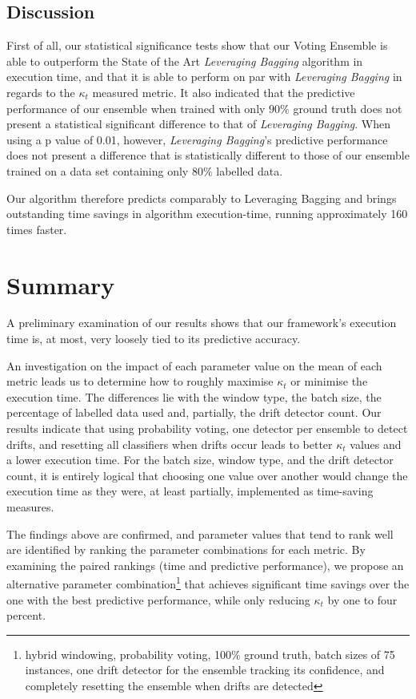 \subsection{Discussion}
First of all, our statistical significance tests show that our Voting Ensemble is able to outperform the State of the Art \textit{Leveraging Bagging} algorithm in execution time, and that it is able to perform on par with \textit{Leveraging Bagging} in regards to the $\kappa_t$ measured metric. It also indicated that the predictive performance of our ensemble when trained with only $90\%$ ground truth does not present a statistical significant difference to that of \textit{Leveraging Bagging}. When using a p value of 0.01, however, \textit{Leveraging Bagging}'s predictive performance does not present a difference that is statistically different to those of our ensemble trained on a data set containing only $80\%$ labelled data.

Our algorithm therefore predicts comparably to Leveraging Bagging and brings outstanding time savings in algorithm execution-time, running approximately 160 times faster.

\section{Summary}
A preliminary examination of our results shows that our framework's execution time is, at most, very loosely tied to its predictive accuracy.

An investigation on the impact of each parameter value on the mean of each metric leads us to determine how to roughly maximise $\kappa_t$ or minimise the execution time.
The differences lie with the window type, the batch size, the percentage of labelled data used and, partially, the drift detector count. Our results indicate that using probability voting, one detector per ensemble to detect drifts, and resetting all classifiers when drifts occur leads to better $\kappa_t$ values and a lower execution time. For the batch size, window type, and the drift detector count, it is entirely logical that choosing one value over another would change the execution time as they were, at least partially, implemented as time-saving measures.

The findings above are confirmed, and parameter values that tend to rank well are identified by ranking the parameter combinations for each metric. By examining the paired rankings (time and predictive performance), we propose an alternative parameter combination\footnote{hybrid windowing, probability voting, 100\% ground truth, batch sizes of 75 instances, one drift detector for the ensemble tracking its confidence, and completely resetting the ensemble when drifts are detected} that achieves significant time savings over the one with the best predictive performance, while only reducing $\kappa_t$ by one to four percent.

